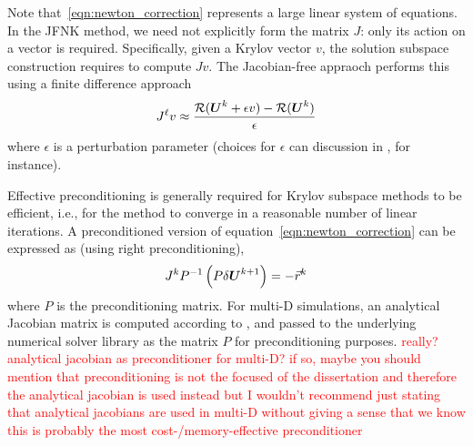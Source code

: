 Note that~\eqref{eqn:newton_correction} represents a large
linear system of equations.  In the JFNK method, we need not
explicitly form the matrix $J$: only its action on a vector is required. Specifically, given a Krylov vector $v$, the solution subspace construction requires to compute $Jv$. The Jacobian-free appraoch performs this using a finite difference approach
\begin{equation}
J^\ell v \approx \frac{ \mathcal{R} (\boldsymbol U^k + \epsilon v) - \mathcal{R} (\boldsymbol U^k)}{\epsilon}
\end{equation}
where $\epsilon$ is a perturbation parameter (choices for $\epsilon$ can discussion in \cite{Knoll_2004}, for instance).

Effective preconditioning is generally required for Krylov subspace
methods to be efficient, i.e., for the method to converge in a
reasonable number of linear iterations. A preconditioned version of
equation~\eqref{eqn:newton_correction} can be expressed as (using
right preconditioning),
\begin{equation}
  \label{eqn:newton_correction_preconditioned}
  J^k P^{-1} \left(P \delta \boldsymbol U^{k+1} \right)= -\vec{r}^k
\end{equation}
where $P$ is the preconditioning matrix. For multi-D simulations, an analytical Jacobian matrix is computed according
to , and passed to the underlying numerical solver
library as the matrix $P$ for preconditioning purposes. \textcolor{red}{really? analytical jacobian as preconditioner for multi-D? if so, maybe you should mention that preconditioning is not the focused of the dissertation and therefore the analytical jacobian is used instead but I wouldn't recommend just stating that analytical jacobians are used in multi-D without giving a sense that we know this is probably the most cost-/memory-effective preconditioner}

